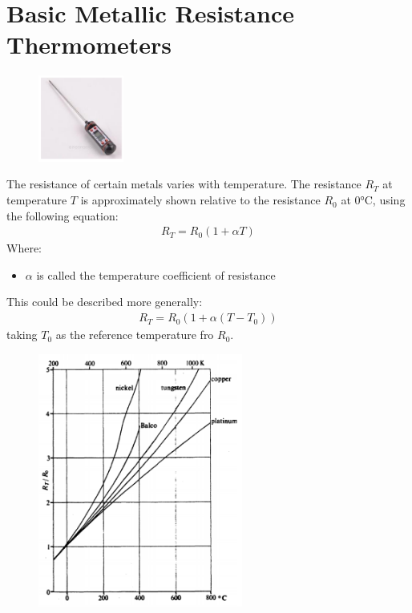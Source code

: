 \documentclass[class=report, crop=false, 12pt,a4paper]{standalone}
\begin{document}
\section{Basic Metallic Resistance Thermometers}
\begin{figure}[H]
  \centering
  \includegraphics[width = 0.25\textwidth]{../img/Mdiagram68.png}
\end{figure}
The resistance of certain metals varies with temperature. The resistance $R_T$ at temperature $T$ is approximately shown relative to the resistance $R_0$ at $\ang{0}$C, using the following equation: 
\begin{gather}
  R_T = R_0 (1+\alpha T)
\end{gather}
Where:
\begin{itemize}
  \item $\alpha$ is called the temperature coefficient of resistance
\end{itemize}
This could be described more generally:
\begin{gather}
  R_T = R_0(1+\alpha(T-T_0))
\end{gather}
taking $T_0$ as the reference temperature fro $R_0$.
\begin{figure}[H]
  \centering
  \includegraphics[width = 0.6\textwidth]{../img/Mdiagram67.png}
\end{figure}
\end{document}
